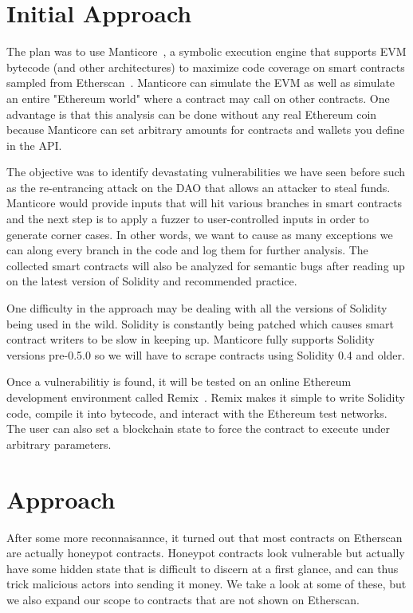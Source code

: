 \section{Initial Approach}

The plan was to use Manticore~\cite{manticore}, a symbolic execution engine that supports EVM bytecode (and other architectures) to maximize code coverage on smart contracts sampled from Etherscan~\cite{etherscan}.
Manticore can simulate the EVM as well as simulate an entire "Ethereum world" where a contract may call on other contracts.
One advantage is that this analysis can be done without any real Ethereum coin because Manticore can set arbitrary amounts for contracts and wallets you define in the API.

The objective was to identify devastating vulnerabilities we have seen before such as the re-entrancing attack on the DAO that allows an attacker to steal funds.
Manticore would provide inputs that will hit various branches in smart contracts and the next step is to apply a fuzzer to user-controlled inputs in order to generate corner cases.
In other words, we want to cause as many exceptions we can along every branch in the code and log them for further analysis.
The collected smart contracts will also be analyzed for semantic bugs after reading up on the latest version of Solidity and recommended practice.

One difficulty in the approach may be dealing with all the versions of Solidity being used in the wild.
Solidity is constantly being patched which causes smart contract writers to be slow in keeping up.
Manticore fully supports Solidity versions pre-0.5.0 so we will have to scrape contracts using Solidity 0.4 and older.

Once a vulnerabilitiy is found, it will be tested on an online Ethereum development environment called Remix~\cite{remix}.
Remix makes it simple to write Solidity code, compile it into bytecode, and interact with the Ethereum test networks.
The user can also set a blockchain state to force the contract to execute under arbitrary parameters.
\section{Approach}
After some more reconnaisannce, it turned out that most contracts on Etherscan are actually honeypot contracts.
Honeypot contracts look vulnerable but actually have some hidden state that is difficult to discern at a first glance, and can thus trick malicious actors into sending it money.
We take a look at some of these, but we also expand our scope to contracts that are not shown on Etherscan.

